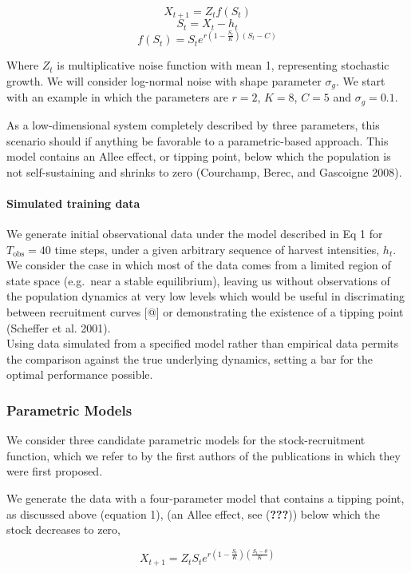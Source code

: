 \documentclass[author-year, review]{elsarticle} %
\begin{document}
\[X_{t+1} = Z_t f(S_t)  \] \[S_t = X_t - h_t \]
\[f(S_t) = S_t e^{r \left(1 - \frac{S_t}{K}\right)\left(S_t - C\right)} \]

Where $Z_t$ is multiplicative noise function with mean 1, representing
stochastic growth. We will consider log-normal noise with shape
parameter $\sigma_g$. We start with an example in which the parameters
are $r =2$, $K=8$, $C=5$ and $\sigma_g = 0.1$.

As a low-dimensional system completely described by three parameters,
this scenario should if anything be favorable to a parametric-based
approach. This model contains an Allee effect, or tipping point, below
which the population is not self-sustaining and shrinks to zero
(Courchamp, Berec, and Gascoigne 2008).

\paragraph{Simulated training data}\label{simulated-training-data}

We generate initial observational data under the model described in Eq 1
for $T_{\textrm{obs}}=40$ time steps, under a given arbitrary sequence
of harvest intensities, $h_t$. We consider the case in which most of the
data comes from a limited region of state space (e.g.~near a stable
equilibrium), leaving us without observations of the population dynamics
at very low levels which would be useful in discrimating between
recruitment curves {[}@{]} or demonstrating the existence of a tipping
point (Scheffer et al. 2001).\\Using data simulated from a specified
model rather than empirical data permits the comparison against the true
underlying dynamics, setting a bar for the optimal performance possible.

\subsubsection{Parametric Models}\label{parametric-models-1}

We consider three candidate parametric models for the stock-recruitment
function, which we refer to by the first authors of the publications in
which they were first proposed.

We generate the data with a four-parameter model that contains a tipping
point, as discussed above (equation 1), (an Allee effect, see
({\textbf{???}})) below which the stock decreases to zero,

\[ X_{t+1} = Z_t S_t e^{r \left(1 - \frac{S_t}{K}\right)\left(\frac{S_t - \theta}{K}\right)} \]
\end{document}
